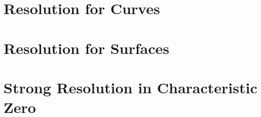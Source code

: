 \documentclass[Total.tex]{subfiles}
\begin{document}
	\chapter{Resolution for Curves}
	
	\chapter{Resolution for Surfaces}
	
	\chapter{Strong Resolution in Characteristic Zero}
\end{document}
